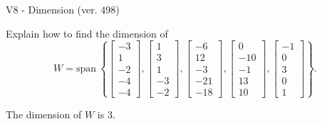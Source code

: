 \begin{exercise}
  \begin{exerciseTitle}V8 - Dimension (ver. 498)\end{exerciseTitle}
  \begin{exerciseStatement}
    Explain how to find the dimension of 
\[W=\mathrm{span}\ \left\{\left[\begin{array}{r}
-3 \\
1 \\
-2 \\
-4 \\
-4
\end{array}\right] , \left[\begin{array}{r}
1 \\
3 \\
1 \\
-3 \\
-2
\end{array}\right] , \left[\begin{array}{r}
-6 \\
12 \\
-3 \\
-21 \\
-18
\end{array}\right] , \left[\begin{array}{r}
0 \\
-10 \\
-1 \\
13 \\
10
\end{array}\right] , \left[\begin{array}{r}
-1 \\
0 \\
3 \\
0 \\
1
\end{array}\right]\right\}.\]



  \end{exerciseStatement}
  \begin{exerciseAnswer}
   The dimension of \(W\) is  \(3\).
  


  \end{exerciseAnswer}
\end{exercise}